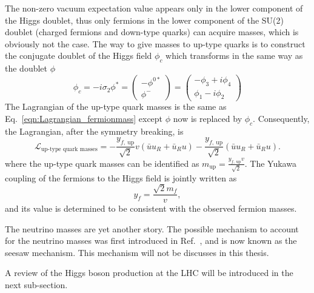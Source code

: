 The non-zero vacuum expectation value appears only in the lower component of the Higgs doublet, thus only fermions in the lower component of the SU(2) doublet (charged fermions and down-type quarks) can acquire masses, which is obviously not the case.
The way to give masses to up-type quarks is to construct the conjugate doublet of the Higgs field $\phi_{c}$ which transforms in the same way as the doublet $\phi$
\begin{equation}
\phi_{c}=-i\sigma_{2}\phi^{\ast}=\begin{pmatrix}
  -\phi^{0\ast} \\ 
  \phi^{-}
 \end{pmatrix} 
 = 
 \begin{pmatrix}
  -\phi_{3}+i\phi_{4} \\ 
  \phi_{1}-i\phi_{2}
  \end{pmatrix} 
\end{equation}
The Lagrangian of the up-type quark masses is the same as Eq.~\ref{eqn:Lagrangian_fermionmass} except $\phi$ now is replaced by $\phi_{c}$. 
Consequently, the Lagrangian, after the symmetry breaking, is
\begin{equation}
\label{eqn:Lagrangian_uptypemass}
\mathcal{L}_{\text{up-type quark masses}} = -\frac{y_{f,\ \text{up}}}{\sqrt{2}}v(\bar{u}u_{R}+\bar{u}_{R}u)-\frac{y_{f,\ \text{up}}}{\sqrt{2}}(\bar{u}u_{R}+\bar{u}_{R}u).
\end{equation}
where the up-type quark masses can be identified as $m_{\text{up}}=\frac{y_{f,\ \text{up}}v}{\sqrt{2}}$.
The Yukawa coupling of the fermions to the Higgs field is jointly written as
\begin{equation}
y_{f}=\frac{\sqrt{2}m_{f}}{v},
\end{equation}
and its value is determined to be consistent with the observed fermion masses.

The neutrino masses are yet another story. The possible mechanism to account for the neutrino masses was first introduced in Ref.~\cite{GellMann:1980vs,PhysRevLett.44.912}, and is now known as the seesaw mechanism. This mechanism will not be discusses in this thesis. 

A review of the Higgs boson production at the LHC will be introduced in the next sub-section. 

